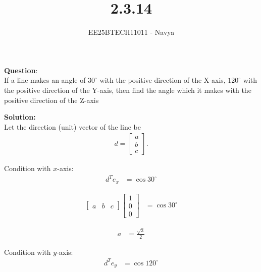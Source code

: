 \documentclass[journal]{IEEEtran}
\begin{document}

\vspace{3cm}

\title{2.3.14}
\author{EE25BTECH11011 - Navya}
{\let\newpage\relax\maketitle}

\renewcommand{\thefigure}{\theenumi}
\renewcommand{\thetable}{\theenumi}
\setlength{\intextsep}{10pt} %

\textbf{Question}:\\
If a line makes an angle of $30^\circ$ with the positive direction of the X-axis, $120^\circ$  with the positive direction of the Y-axis, then find the angle which it makes with the positive direction of the Z-axis

\textbf{Solution:} \\
Let the direction (unit) vector of the line be
\begin{align}  
d = \begin{bmatrix} a \\ b \\ c \end{bmatrix}.
\end{align}

Condition with $x$-axis:
\begin{align}
d^T e_x &= \cos 30^\circ 
\end{align}

\begin{align}
\begin{bmatrix} a & b & c \end{bmatrix}
\begin{bmatrix} 1 \\ 0 \\ 0 \end{bmatrix} &= \cos 30^\circ 
\end{align}

\begin{align}
a &= \tfrac{\sqrt{3}}{2} 
\end{align}

Condition with $y$-axis:
\begin{align}
d^T e_y &= \cos 120^\circ 
\end{align}
\end{document}
